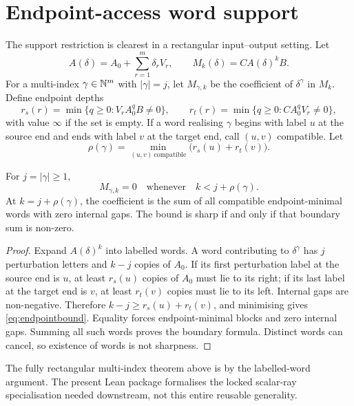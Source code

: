 \section{Endpoint-access word support}\label{sec:endpoint}

The support restriction is clearest in a rectangular input--output setting.
Let
\[
A(\delta)=A_0+\sum_{r=1}^m\delta_rV_r,\qquad
M_k(\delta)=CA(\delta)^kB.
\]
For a multi-index \(\gamma\in\mathbb N^m\) with \(|\gamma|=j\), let
\(M_{\gamma,k}\) be the coefficient of \(\delta^\gamma\) in \(M_k\).
Define endpoint depths
\[
r_s(r)=\min\{q\ge0:V_rA_0^qB\ne0\},\qquad
r_t(r)=\min\{q\ge0:CA_0^qV_r\ne0\},
\]
with value \(\infty\) if the set is empty.  If a word realising \(\gamma\)
begins with label \(u\) at the source end and ends with label \(v\) at the
target end, call \((u,v)\) compatible.  Let
\[
\rho(\gamma)=\min_{(u,v)\ \mathrm{compatible}}
\bigl(r_s(u)+r_t(v)\bigr).
\]

\begin{theorem}\label{thm:endpoint}
For \(j=|\gamma|\ge1\),
\begin{equation}\label{eq:endpointbound}
M_{\gamma,k}=0\quad\text{whenever}\quad k<j+\rho(\gamma).
\end{equation}
At \(k=j+\rho(\gamma)\), the coefficient is the sum of all compatible
endpoint-minimal words with zero internal gaps.  The bound is sharp if and only
if that boundary sum is non-zero.
\end{theorem}
\begin{proof}
Expand \(A(\delta)^k\) into labelled words.  A word contributing to
\(\delta^\gamma\) has \(j\) perturbation letters and \(k-j\) copies of \(A_0\).
If its first perturbation label at the source end is \(u\), at least
\(r_s(u)\) copies of \(A_0\) must lie to its right; if its last label at the
target end is \(v\), at least \(r_t(v)\) copies must lie to its left.  Internal
gaps are non-negative.  Therefore \(k-j\ge r_s(u)+r_t(v)\), and minimising gives
\cref{eq:endpointbound}.  Equality forces endpoint-minimal blocks and zero
internal gaps.  Summing all such words proves the boundary formula.  Distinct
words can cancel, so existence of words is not sharpness.
\end{proof}

The fully rectangular multi-index theorem above is  by the
labelled-word argument.  The present Lean package formalises the locked
scalar-ray specialisation needed downstream, not this entire reusable
generality.


